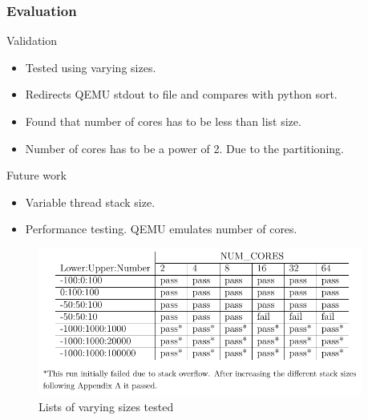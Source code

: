 \begin{frame}[hoved]
	\frametitle{Evaluation}
	\begin{minipage}[t]{0.45\textwidth}
		{\large Validation}
		\begin{itemize}
			\item Tested using varying sizes.
			\item Redirects QEMU stdout to file and compares with python sort.
			\item Found that number of cores has to be less than list size.
			\item Number of cores has to be a power of 2. Due to the partitioning.
		\end{itemize}
		{\large Future work}
		\begin{itemize}
			\item Variable thread stack size.
			\item Performance testing. QEMU emulates number of cores.
		\end{itemize}
	\end{minipage}
	\hfill
	\begin{minipage}[t]{0.45\textwidth}
		\begin{figure}
			\begin{center}
				\includegraphics[width=0.95\textwidth]{figures/validate.png}
			\end{center}
			\caption{Lists of varying sizes tested}\label{fig:validate}
		\end{figure}
	\end{minipage}
\end{frame}
